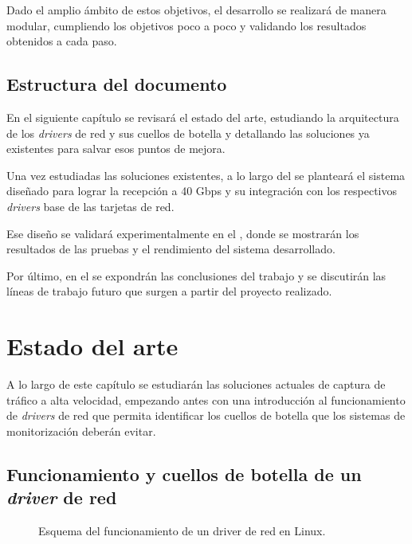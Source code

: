 \documentclass[twoside, 12pt]{epstfg}
\begin{document}
Dado el amplio ámbito de estos objetivos, el desarrollo se realizará de manera modular, cumpliendo los objetivos poco a poco y validando los resultados obtenidos a cada paso.

\section{Estructura del documento}

En el siguiente capítulo se revisará el estado del arte, estudiando la arquitectura de los \textit{drivers} de red y sus cuellos de botella y detallando las soluciones ya existentes para salvar esos puntos de mejora.

Una vez estudiadas las soluciones existentes, a lo largo del  se planteará el sistema diseñado para lograr la recepción a 40 Gbps y su integración con los respectivos \textit{drivers} base de las tarjetas de red.

Ese diseño se validará experimentalmente en el , donde se mostrarán los resultados de las pruebas y el rendimiento del sistema desarrollado.

Por último, en el  se expondrán las conclusiones del trabajo y se discutirán las líneas de trabajo futuro que surgen a partir del proyecto realizado.

\chapter{Estado del arte}

A lo largo de este capítulo se estudiarán las soluciones actuales de captura de tráfico a alta velocidad, empezando antes con una introducción al funcionamiento de \textit{drivers} de red que permita identificar los cuellos de botella que los sistemas de monitorización deberán evitar.

\section{Funcionamiento y cuellos de botella de un \textit{driver} de red}
\label{sec:EstadoArte:Funcionamiento}

\begin{figure}[hbtp]
\centering

\caption[Funcionamiento de un \textit{driver} de red en Linux]{Esquema del funcionamiento de un \gls{driver} de red en Linux.}
\label{fig:EstadoArte:LinuxNetworkStack}
\end{figure}
\end{document}
